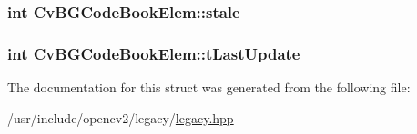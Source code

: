\hypertarget{structCvBGCodeBookElem_a0e90c1442d2b945a5e013dd9bc4ac8a0}{
\subsubsection[{stale}]{\setlength{\rightskip}{0pt plus 5cm}int Cv\-B\-G\-Code\-Book\-Elem\-::stale}}\label{structCvBGCodeBookElem_a0e90c1442d2b945a5e013dd9bc4ac8a0}
\hypertarget{structCvBGCodeBookElem_ad4f0dd0fbb1b5b498b2a25bf189e4c0c}{
\subsubsection[{t\-Last\-Update}]{\setlength{\rightskip}{0pt plus 5cm}int Cv\-B\-G\-Code\-Book\-Elem\-::t\-Last\-Update}}\label{structCvBGCodeBookElem_ad4f0dd0fbb1b5b498b2a25bf189e4c0c}


The documentation for this struct was generated from the following file\-:\begin{DoxyCompactItemize}
\item 
/usr/include/opencv2/legacy/\hyperlink{legacy_8hpp}{legacy.\-hpp}\end{DoxyCompactItemize}
